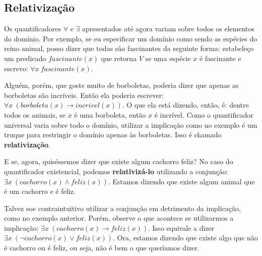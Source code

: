     \subsection{Relativização}

    Os quantificadores $\forall$ e $\exists$ apresentados até agora variam sobre todos os elementos do domínio.
    Por exemplo, se eu especificar um domínio como sendo as espécies do reino animal, posso dizer que todas são fascinantes da seguinte forma:
    estabeleço um predicado $fascinante(x)$ que retorna $V$ se uma espécie $x$ é fascinante e escrevo: $\forall x \ fascinante(x)$.
    
    Alguém, porém, que goste muito de borboletas, poderia dizer que apenas as borboletas são incríveis. Então ela poderia escrever:
    $\forall x \ (borboleta(x) \rightarrow incrivel(x))$. O que ela está dizendo, então, é: dentre todos os animais, se $x$ é uma borboleta, então $x$ é incrível.
    Como o quantificador universal varia sobre todo o domínio, utilizar a implicação como no exemplo é um truque para restringir o domínio apenas às borboletas.
    Isso é chamado \textbf{relativização}.

    E se, agora, quiséssemos dizer que existe algum cachorro feliz? No caso do quantificador existencial, podemos \textbf{relativizá-lo} utilizando a conjunção:
    $\exists x \ (cachorro(x) \land feliz(x))$. Estamos dizendo que existe algum animal que é um cachorro e é feliz.

    Talvez soe contraintuitivo utilizar a conjunção em detrimento da implicação, como no exemplo anterior. Porém, observe o que acontece se utilizarmos a implicação:
    $\exists x \ (cachorro(x) \rightarrow feliz(x))$. Isso equivale a dizer $\exists x \ (\lnot cachorro(x) \lor feliz(x))$. Ora, estamos dizendo que existe algo que não é cachorro ou é feliz, ou seja, não é bem o que queríamos dizer.
